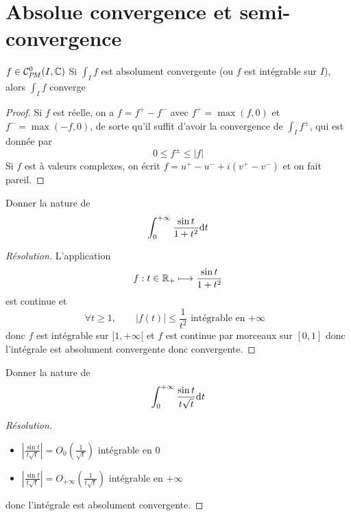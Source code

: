 \section{Absolue convergence et semi-convergence}

\begin{prop}
    \Hyp $f\in\CPM(I, \C)$
    \Conc Si $\displaystyle\int_If$ est absolument convergente (ou $f$ est intégrable sur $I$), alors $\displaystyle\int_If$ converge
\end{prop}

\begin{proof}
    Si $f$ est réelle, on a $f=f^+-f^-$ avec $f^+=\max(f,0)$ et $f^-=\max(-f,0)$, de sorte qu'il suffit d'avoir la convergence de $\displaystyle\int_If^\pm$, qui est donnée par \[
        0\leq f^\pm\leq |f|
    \]
    Si $f$ est à valeurs complexes, on écrit $f=u^+-u^-+i(v^+-v^-)$ et on fait pareil.
\end{proof}

\begin{exo}
    Donner la nature de \[
        \int_0^{+\infty}\frac{\sin t}{1+t^2}\mathrm{d} t
    \]
\end{exo}

\begin{proof}[Résolution]
    L'application \[
            f:t\in\mathbb R_+\longmapsto \frac{\sin t}{1+t^2}
    \]
    est continue et \[
        \forall t\geq 1, \qquad |f(t)|\leq \frac1{t^2}\text{ intégrable en $+\infty$ }
    \]
    donc $f$ est intégrable sur $[1, +\infty[$ et $f$ est continue par morceaux sur $[0, 1]$ donc l'intégrale est absolument convergente donc convergente.
\end{proof}

\begin{exo}
    Donner la nature de \[
        \int_0^{+\infty}\frac{\sin t}{t\sqrt t}\mathrm{d} t
    \]
\end{exo}

\begin{proof}[Résolution]~
    \begin{itemize}
        \item $\displaystyle \left| \frac{\sin t}{t\sqrt t} \right|=O_0 \left( \frac1{\sqrt t} \right)$ intégrable en $0$
        \item $\displaystyle \left| \frac{\sin t}{t\sqrt t} \right|=O_{+\infty} \left( \frac1{t\sqrt t} \right)$ intégrable en $+\infty$
    \end{itemize}
    donc l'intégrale est absolument convergente.
\end{proof}

